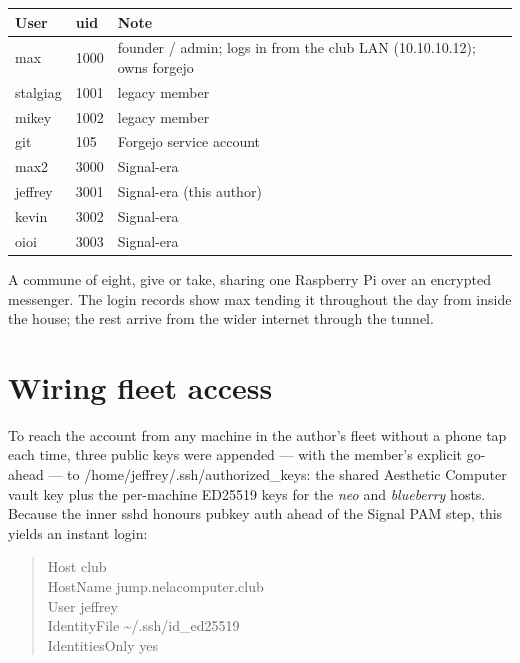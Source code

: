 \documentclass[10pt,letterpaper,twocolumn]{article}
\newcommand{\fp}[1]{{\ttfamily\small\color{acdark}#1}}
\begin{document}
\begin{center}
\small
\begin{tabularx}{\columnwidth}{@{}llX@{}}
\toprule
\textbf{User} & \textbf{uid} & \textbf{Note} \\
\midrule
max       & 1000 & founder / admin; logs in from the club LAN (\fp{10.10.10.12}); owns \fp{forgejo} \\
stalgiag  & 1001 & legacy member \\
mikey     & 1002 & legacy member \\
git       & 105  & Forgejo service account \\
max2      & 3000 & Signal-era \\
jeffrey   & 3001 & Signal-era (this author) \\
kevin     & 3002 & Signal-era \\
oioi      & 3003 & Signal-era \\
\bottomrule
\end{tabularx}
\end{center}

A commune of eight, give or take, sharing one Raspberry Pi over an encrypted
messenger. The login records show \fp{max} tending it throughout the day from
inside the house; the rest arrive from the wider internet through the tunnel.

\section{Wiring fleet access}

To reach the account from any machine in the author's fleet without a phone tap
each time, three public keys were appended --- with the member's explicit
go-ahead --- to \fp{/home/jeffrey/.ssh/authorized\_keys}: the shared
Aesthetic Computer vault key plus the per-machine ED25519 keys for the \emph{neo}
and \emph{blueberry} hosts. Because the inner sshd honours pubkey auth ahead of
the Signal PAM step, this yields an instant login:

\begin{quote}\ttfamily\small
Host club\\
\hspace*{1em}HostName jump.nelacomputer.club\\
\hspace*{1em}User jeffrey\\
\hspace*{1em}IdentityFile \textasciitilde/.ssh/id\_ed25519\\
\hspace*{1em}IdentitiesOnly yes
\end{quote}
\end{document}
